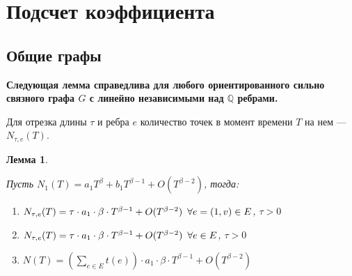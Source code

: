 \documentclass{article}
\newcommand{\squad}{
    \hspace{0.5em}
}
\newtheorem{lemma}{Лемма}
\begin{document}
\pagebreak

\section{Подсчет коэффициента}

\subsection{Общие графы}

\textbf{Следующая лемма справедлива для любого ориентированного сильно связного графа $G$ с линейно независимыми над $\mathbb{Q}$ ребрами.}

Для отрезка длины $\tau$ и ребра $e$ количество точек в момент времени $T$ на нем --- $N_{\tau, e}(T)$.

\begin{lemma} $ $

\label{pg}
Пусть $N_{1}(T) = a_{1}T^{\beta} + b_{1}T^{\beta - 1} + O(T^{\beta - 2})$, тогда:
\begin{enumerate} 
    \item $N_{\tau, e}(T) = \tau \cdot a_{1} \cdot \beta \cdot T^{\beta - 1} + O(T^{\beta - 2}) \squad \forall e = (1, v) \in E$, $\tau > 0$
    \item $N_{\tau, e}(T) = \tau \cdot a_{1} \cdot \beta \cdot T^{\beta - 1} + O(T^{\beta - 2}) \squad \forall e \in E$, $\tau > 0$
    \item $N(T) = \left(\sum_{e \in E}{t(e)}\right) \cdot a_{1} \cdot \beta \cdot T^{\beta - 1} + O(T^{\beta - 2})$
\end{enumerate}
\end{lemma} 
\end{document}
